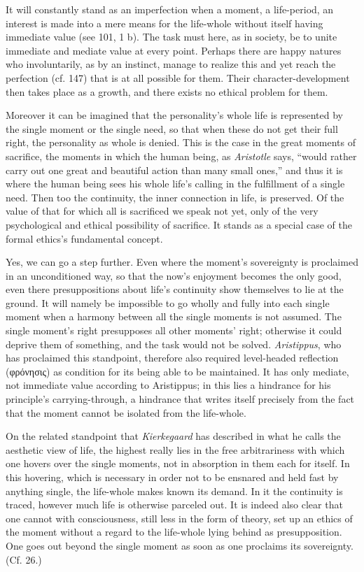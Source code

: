\documentclass[12pt,a4paper]{book}
\newcommand{\opage}[1]{\marginnote{\footnotesize\textit{[#1]}}}
\begin{document}
It will constantly stand as an imperfection when a moment, a life-period, an interest is made into a mere means
for the life-whole without itself having immediate value (see 101, 1 b). The task must here, as in society, be to
unite immediate and mediate value at every point. Perhaps there are happy natures who involuntarily, as by an
instinct, manage to realize this and yet reach the perfection (cf. 147) that is at all possible for them. Their
character-development then takes place as a growth, and there exists no ethical problem for them.

Moreover it can be imagined that the personality's whole life is represented by the single moment or the single
need, so that when these do not get their full right, the personality as whole is denied. This is the case in the
great moments of sacrifice, the moments in which the human being, as \emph{\opage{358}Aristotle} says, ``would rather carry
out one great and beautiful action than many small ones,'' and thus it is where the human being sees his whole
life's calling in the fulfillment of a single need. Then too the continuity, the inner connection in life, is
preserved. Of the value of that for which all is sacrificed we speak not yet, only of the very psychological and
ethical possibility of sacrifice. It stands as a special case of the formal ethics's fundamental concept.

Yes, we can go a step further. Even where the moment's sovereignty is proclaimed in an unconditioned way, so that
the now's enjoyment becomes the only good, even there presuppositions about life's continuity show themselves to
lie at the ground. It will namely be impossible to go wholly and fully into each single moment when a harmony
between all the single moments is not assumed. The single moment's right presupposes all other moments' right;
otherwise it could deprive them of something, and the task would not be solved. \emph{Aristippus}, who has
proclaimed this standpoint, therefore also required level-headed reflection (φρόνησις) as condition for its being
able to be maintained. It has only mediate, not immediate value according to Aristippus; in this lies a hindrance
for his principle's carrying-through, a hindrance that writes itself precisely from the fact that the moment cannot
be isolated from the life-whole.

On the related standpoint that \emph{Kierkegaard} has described in what he calls the aesthetic view of life, the
highest really lies in the free arbitrariness with which one hovers over the single moments, not in absorption in
them each for itself. In this hovering, which is necessary in order not to be ensnared and held fast by anything
single, the life-whole makes known its demand. In it the continuity is traced, however much life is otherwise
parceled out. It is indeed also clear that one cannot with consciousness, still less in the form of theory, set up
an ethics of the moment without a regard to the life-whole lying behind as presupposition. One goes out beyond the
single moment as soon as one proclaims its sovereignty. (Cf. 26.)
\end{document}
